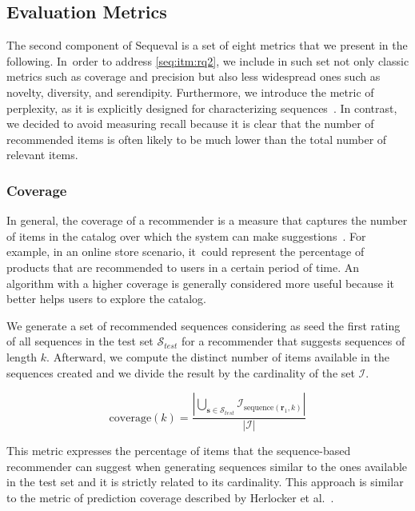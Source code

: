 \subsection{Evaluation Metrics}
\label{seq:sec:metrics}

The second component of Sequeval is a set of eight metrics that we present in the following. In~order to address \ref{seq:itm:rq2}, we include in such set not only classic metrics such as coverage and precision but also less widespread ones such as novelty, diversity, and serendipity. Furthermore, we introduce the metric of perplexity, as it is explicitly designed for characterizing sequences~\cite{Bengio2003}. In contrast, we decided to avoid measuring recall because it is clear that the number of recommended items is often likely to be much lower than the total number of relevant items.

\subsubsection{Coverage}

In general, the coverage of a recommender is a measure that captures the number of items in the catalog over which the system can make suggestions~\cite{Gunawardana2015}. For example, in an online store scenario, it~could represent the percentage of products that are recommended to users in a certain period of time. An algorithm with a higher coverage is generally considered more useful because it better helps users to explore the catalog.

We generate a set of recommended sequences considering as seed the first rating of all sequences in the test set $\mathcal{S}_{test}$ for a recommender that suggests sequences of length $k$. Afterward, we compute the distinct number of items available in the sequences created and we divide the result by the cardinality of the set $\mathcal{I}$.

\begin{equation}
\mathrm{coverage}(k) = \frac{|\bigcup_{\mathbf{s} \in \mathcal{S}_{test}} \mathcal{I}_{\mathrm{sequence}(\mathbf{r}_1, k)}|}{|\mathcal{I}|}
\end{equation}

This metric expresses the percentage of items that the sequence-based recommender can suggest when generating sequences similar to the ones available in the test set and it is strictly related to its cardinality. This approach is similar to the metric of prediction coverage described by Herlocker et al.~\cite{Herlocker2004}.

